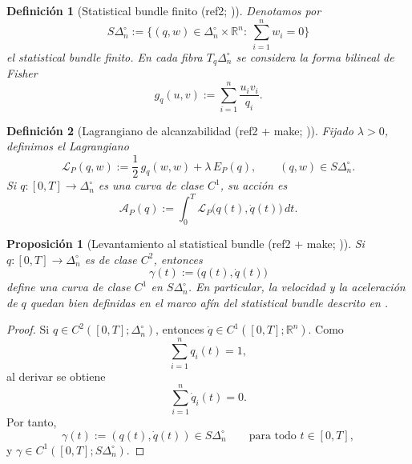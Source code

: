 ﻿\documentclass[12pt]{article}
\newcommand{\fuentecite}[2]{\textnormal{(#1; \citealp{#2})}}
\newcommand{\fuentemakecite}[2]{\textnormal{(#1 + make; \citealp{#2})}}
\newtheorem{definicion}{Definición}[section]
\newtheorem{proposicion}{Proposición}[section]
\begin{document}
\begin{definicion}[Statistical bundle finito \fuentecite{ref2}{Pistone2018Lagrangian}]
Denotamos por
\[
S\Delta_n^\circ:=\{(q,w)\in \Delta_n^\circ\times\mathbb R^n:\ \sum_{i=1}^n w_i=0\}
\]
el statistical bundle finito. En cada fibra \(T_q\Delta_n^\circ\) se considera la forma bilineal de Fisher
\[
g_q(u,v):=\sum_{i=1}^n \frac{u_i v_i}{q_i}.
\]
\end{definicion}

\begin{definicion}[Lagrangiano de alcanzabilidad \fuentemakecite{ref2}{Pistone2018Lagrangian}]
Fijado \(\lambda>0\), definimos el Lagrangiano
\[
\mathcal L_P(q,w):=\frac12\,g_q(w,w)+\lambda\,E_P(q),
\qquad (q,w)\in S\Delta_n^\circ.
\]
Si \(q:[0,T]\to \Delta_n^\circ\) es una curva de clase \(C^1\), su acción es
\[
\mathcal A_P(q):=\int_0^T \mathcal L_P\bigl(q(t),\dot q(t)\bigr)\,dt.
\]
\end{definicion}

\begin{proposicion}[Levantamiento al statistical bundle \fuentemakecite{ref2}{Pistone2018Lagrangian}]
Si \(q:[0,T]\to\Delta_n^\circ\) es de clase \(C^2\), entonces
\[
\gamma(t):=\bigl(q(t),\dot q(t)\bigr)
\]
define una curva de clase \(C^1\) en \(S\Delta_n^\circ\). En particular, la velocidad y la aceleración de \(q\) quedan bien definidas en el marco afín del statistical bundle descrito en \cite{Pistone2018Lagrangian}.
\end{proposicion}
\begin{proof}
Si \(q\in C^2([0,T];\Delta_n^\circ)\), entonces \(\dot q\in C^1([0,T];\mathbb R^n)\). Como
\[
\sum_{i=1}^n q_i(t)=1,
\]
al derivar se obtiene
\[
\sum_{i=1}^n \dot q_i(t)=0.
\]
Por tanto,
\[
\gamma(t):=(q(t),\dot q(t))\in S\Delta_n^\circ
\qquad\text{para todo }t\in[0,T],
\]
y \(\gamma\in C^1([0,T];S\Delta_n^\circ)\).
\end{proof}
\end{document}

